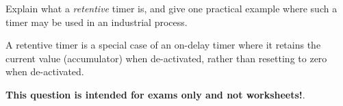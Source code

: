 

Explain what a {\it retentive} timer is, and give one practical example where such a timer may be used in an industrial process.







A retentive timer is a special case of an on-delay timer where it retains the current value (accumulator) when de-activated, rather than resetting to zero when de-activated.







{\bf This question is intended for exams only and not worksheets!}.



